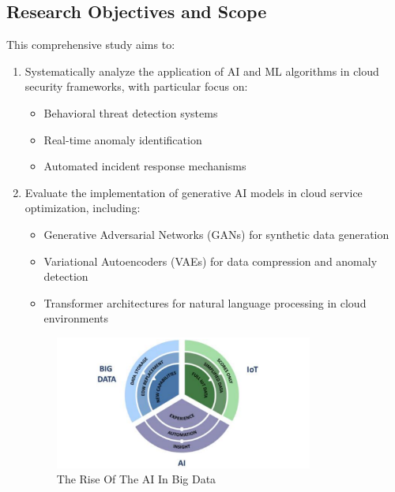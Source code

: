 \documentclass[a4paper,12pt]{article}
\begin{document}
\subsection{Research Objectives and Scope}
This comprehensive study aims to:
\begin{enumerate}
    \item Systematically analyze the application of AI and ML algorithms in cloud security frameworks, with particular focus on:
          \begin{itemize}
              \item Behavioral threat detection systems
              \item Real-time anomaly identification
              \item Automated incident response mechanisms
          \end{itemize}
    \item Evaluate the implementation of generative AI models in cloud service optimization, including:
          \begin{itemize}
              \item Generative Adversarial Networks (GANs) for synthetic data generation
              \item Variational Autoencoders (VAEs) for data compression and anomaly detection
              \item Transformer architectures for natural language processing in cloud environments
          \end{itemize}

          \begin{figure}[H]
              \centering
              \includegraphics[width=0.8\textwidth]{image1.png}
              \caption{The Rise Of The AI In Big Data}
              \label{fig:rise-ai}
          \end{figure}


\end{enumerate}
\end{document}
